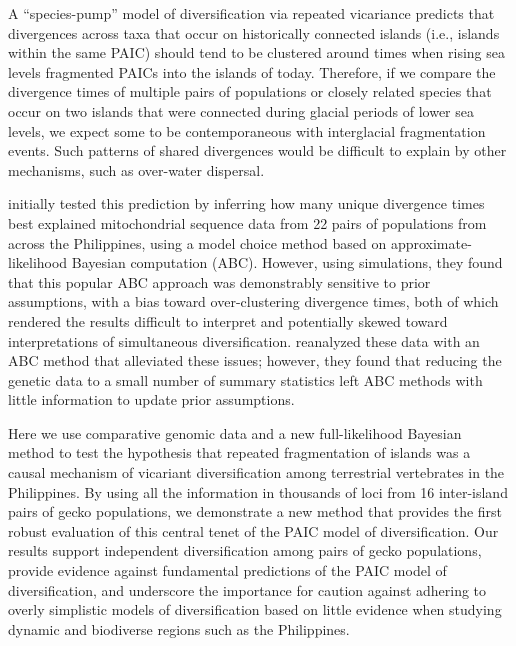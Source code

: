 A ``species-pump'' model of diversification via repeated vicariance predicts
that divergences across taxa that occur on historically connected islands
(i.e., islands within the same PAIC) should tend to be clustered around times
when rising sea levels fragmented PAICs into the islands of today.
Therefore, if we compare the divergence times of multiple pairs of populations
or closely related species that occur on two islands that were connected during
glacial periods of lower sea levels, we expect some to be contemporaneous
with interglacial fragmentation events.
Such patterns of shared divergences would be difficult to explain by
other mechanisms, such as over-water dispersal.

\citet{Oaks2012} initially tested this prediction by inferring how many unique
divergence times best explained mitochondrial sequence data from 22 pairs of
populations from across the Philippines, using a model choice method based on
approximate-likelihood Bayesian computation (ABC).
However, using simulations, they found that this popular ABC approach was
demonstrably sensitive to prior assumptions, with a bias toward over-clustering
divergence times, both of which rendered the results difficult to interpret
and potentially skewed toward interpretations of simultaneous diversification.
\citet{Oaks2014dpp} reanalyzed these data with an ABC method that alleviated
these issues; however, they found that reducing the genetic data to a small
number of summary statistics left ABC methods with little information to update
prior assumptions.

Here we use comparative genomic data and a new full-likelihood Bayesian method
to test the hypothesis that repeated fragmentation of islands was a causal
mechanism of vicariant diversification among terrestrial vertebrates in the
Philippines.
By using all the information in thousands of loci from 16 inter-island
pairs of gecko populations,
we demonstrate a new method that provides the first robust evaluation of
this central tenet of the PAIC model of diversification.
Our results support independent diversification among pairs of gecko
populations,
provide evidence against fundamental predictions of the PAIC model of
diversification,
and underscore the importance for caution against adhering to overly simplistic
models of diversification based on little evidence when studying dynamic and
biodiverse regions such as the Philippines.


